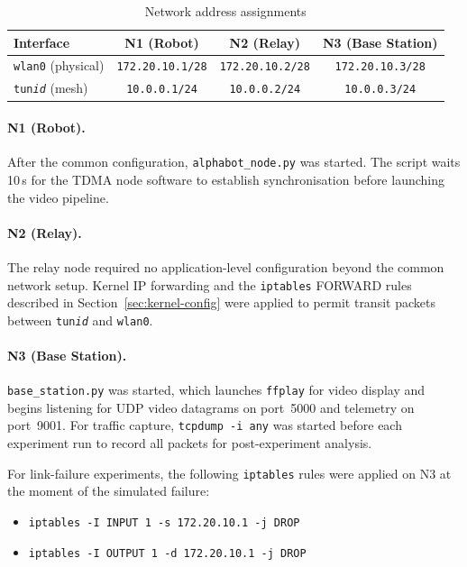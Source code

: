 \begin{table}[h]
\centering
\caption{Network address assignments}
\label{tab:netconfig}
\begin{tabular}{lccc}
\toprule
\textbf{Interface} & \textbf{N1 (Robot)} & \textbf{N2 (Relay)} & \textbf{N3 (Base Station)} \\
\midrule
\texttt{wlan0} (physical) & \texttt{172.20.10.1/28} & \texttt{172.20.10.2/28} & \texttt{172.20.10.3/28} \\
\texttt{tun\textit{id}} (mesh)   & \texttt{10.0.0.1/24}    & \texttt{10.0.0.2/24}    & \texttt{10.0.0.3/24}    \\
\bottomrule
\end{tabular}
\end{table}

\paragraph{N1 (Robot).}
After the common configuration, \texttt{alphabot\_node.py} was started. The
script waits 10\,s for the TDMA node software to establish synchronisation
before launching the video pipeline.

\paragraph{N2 (Relay).}
The relay node required no application-level configuration beyond the common
network setup. Kernel IP forwarding and the \texttt{iptables} FORWARD rules
described in Section~\ref{sec:kernel-config} were applied to permit transit
packets between \texttt{tun\textit{id}} and \texttt{wlan0}.

\paragraph{N3 (Base Station).}
\texttt{base\_station.py} was started, which launches \texttt{ffplay} for
video display and begins listening for UDP video datagrams on port~5000 and
telemetry on port~9001. For traffic capture, \texttt{tcpdump -i any} was
started before each experiment run to record all packets for
post-experiment analysis.

For link-failure experiments, the following \texttt{iptables} rules were
applied on N3 at the moment of the simulated failure:

\begin{itemize}
  \item \texttt{iptables -I INPUT 1 -s 172.20.10.1 -j DROP}
  \item \texttt{iptables -I OUTPUT 1 -d 172.20.10.1 -j DROP}
\end{itemize}

